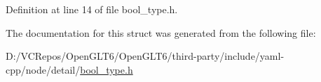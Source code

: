 Definition at line 14 of file bool\+\_\+type.\+h.



The documentation for this struct was generated from the following file\+:\begin{DoxyCompactItemize}
\item 
D\+:/\+V\+C\+Repos/\+Open\+G\+L\+T6/\+Open\+G\+L\+T6/third-\/party/include/yaml-\/cpp/node/detail/\mbox{\hyperlink{bool__type_8h}{bool\+\_\+type.\+h}}\end{DoxyCompactItemize}
